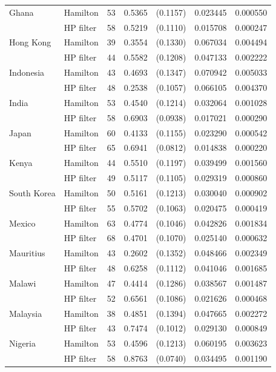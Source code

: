 \begin{table}[htbp]
\begin{tabular}{llrcccc}
    Ghana & Hamilton & 53 & 0.5365 & (0.1157) & 0.023445 & 0.000550 \\
    & HP filter & 58 & 0.5219 & (0.1110) & 0.015708 & 0.000247 \\[3pt]
    Hong Kong & Hamilton & 39 & 0.3554 & (0.1330) & 0.067034 & 0.004494 \\
    & HP filter & 44 & 0.5582 & (0.1208) & 0.047133 & 0.002222 \\[3pt]
    Indonesia & Hamilton & 43 & 0.4693 & (0.1347) & 0.070942 & 0.005033 \\
    & HP filter & 48 & 0.2538 & (0.1057) & 0.066105 & 0.004370 \\[3pt]
    India & Hamilton & 53 & 0.4540 & (0.1214) & 0.032064 & 0.001028 \\
    & HP filter & 58 & 0.6903 & (0.0938) & 0.017021 & 0.000290 \\[3pt]
    Japan & Hamilton & 60 & 0.4133 & (0.1155) & 0.023290 & 0.000542 \\
    & HP filter & 65 & 0.6941 & (0.0812) & 0.014838 & 0.000220 \\[3pt]
    Kenya & Hamilton & 44 & 0.5510 & (0.1197) & 0.039499 & 0.001560 \\
    & HP filter & 49 & 0.5117 & (0.1105) & 0.029319 & 0.000860 \\[3pt]
    South Korea & Hamilton & 50 & 0.5161 & (0.1213) & 0.030040 & 0.000902 \\
    & HP filter & 55 & 0.5702 & (0.1063) & 0.020475 & 0.000419 \\[3pt]
    Mexico & Hamilton & 63 & 0.4774 & (0.1046) & 0.042826 & 0.001834 \\
    & HP filter & 68 & 0.4701 & (0.1070) & 0.025140 & 0.000632 \\[3pt]
    Mauritius & Hamilton & 43 & 0.2602 & (0.1352) & 0.048466 & 0.002349 \\
    & HP filter & 48 & 0.6258 & (0.1112) & 0.041046 & 0.001685 \\[3pt]
    Malawi & Hamilton & 47 & 0.4414 & (0.1286) & 0.038567 & 0.001487 \\
    & HP filter & 52 & 0.6561 & (0.1086) & 0.021626 & 0.000468 \\[3pt]
    Malaysia & Hamilton & 38 & 0.4851 & (0.1394) & 0.047665 & 0.002272 \\
    & HP filter & 43 & 0.7474 & (0.1012) & 0.029130 & 0.000849 \\[3pt]
    Nigeria & Hamilton & 53 & 0.4596 & (0.1213) & 0.060195 & 0.003623 \\
    & HP filter & 58 & 0.8763 & (0.0740) & 0.034495 & 0.001190 \\[3pt]

\end{tabular}
\end{table}
